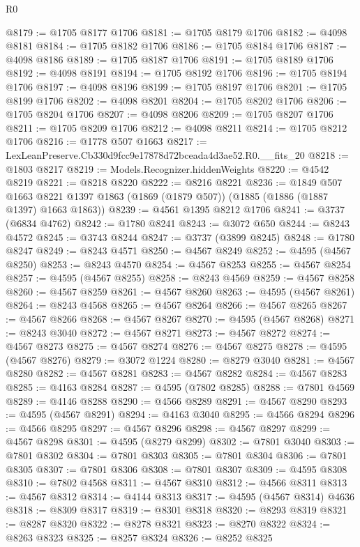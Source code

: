 \begin{lexlean}{R0}
\begin{coremodule}
@8179 := @1705 @8177 @1706
@8181 := @1705 @8179 @1706
@8182 := @4098 @8181
@8184 := @1705 @8182 @1706
@8186 := @1705 @8184 @1706
@8187 := @4098 @8186
@8189 := @1705 @8187 @1706
@8191 := @1705 @8189 @1706
@8192 := @4098 @8191
@8194 := @1705 @8192 @1706
@8196 := @1705 @8194 @1706
@8197 := @4098 @8196
@8199 := @1705 @8197 @1706
@8201 := @1705 @8199 @1706
@8202 := @4098 @8201
@8204 := @1705 @8202 @1706
@8206 := @1705 @8204 @1706
@8207 := @4098 @8206
@8209 := @1705 @8207 @1706
@8211 := @1705 @8209 @1706
@8212 := @4098 @8211
@8214 := @1705 @8212 @1706
@8216 := @1778 @507 @1663
@8217 := LexLeanPreserve.Cb330d9fcc9e17878d72bceada4d3ae52.R0.__fits_20
@8218 := @1803 @8217
@8219 := Models.Recognizer.hiddenWeights
@8220 := @4542 @8219
@8221 := @8218 @8220
@8222 := @8216 @8221
@8236 := @1849
    @507
    @1663
    @8221
    @1397
    @1863
    (@1869 (@1879 @507))
    (@1885 (@1886 (@1887 @1397) @1663 @1863))
@8239 := @4561 @1395 @8212 @1706
@8241 := @3737 (@6834 @4762)
@8242 := @1780 @8241
@8243 := @3072 @650
@8244 := @8243 @4572
@8245 := @3743 @8244
@8247 := @3737 (@3899 @8245)
@8248 := @1780 @8247
@8249 := @8243 @4571
@8250 := @4567 @8249
@8252 := @4595 (@4567 @8250)
@8253 := @8243 @4570
@8254 := @4567 @8253
@8255 := @4567 @8254
@8257 := @4595 (@4567 @8255)
@8258 := @8243 @4569
@8259 := @4567 @8258
@8260 := @4567 @8259
@8261 := @4567 @8260
@8263 := @4595 (@4567 @8261)
@8264 := @8243 @4568
@8265 := @4567 @8264
@8266 := @4567 @8265
@8267 := @4567 @8266
@8268 := @4567 @8267
@8270 := @4595 (@4567 @8268)
@8271 := @8243 @3040
@8272 := @4567 @8271
@8273 := @4567 @8272
@8274 := @4567 @8273
@8275 := @4567 @8274
@8276 := @4567 @8275
@8278 := @4595 (@4567 @8276)
@8279 := @3072 @1224
@8280 := @8279 @3040
@8281 := @4567 @8280
@8282 := @4567 @8281
@8283 := @4567 @8282
@8284 := @4567 @8283
@8285 := @4163 @8284
@8287 := @4595 (@7802 @8285)
@8288 := @7801 @4569
@8289 := @4146 @8288
@8290 := @4566 @8289
@8291 := @4567 @8290
@8293 := @4595 (@4567 @8291)
@8294 := @4163 @3040
@8295 := @4566 @8294
@8296 := @4566 @8295
@8297 := @4567 @8296
@8298 := @4567 @8297
@8299 := @4567 @8298
@8301 := @4595 (@8279 @8299)
@8302 := @7801 @3040
@8303 := @7801 @8302
@8304 := @7801 @8303
@8305 := @7801 @8304
@8306 := @7801 @8305
@8307 := @7801 @8306
@8308 := @7801 @8307
@8309 := @4595 @8308
@8310 := @7802 @4568
@8311 := @4567 @8310
@8312 := @4566 @8311
@8313 := @4567 @8312
@8314 := @4144 @8313
@8317 := @4595 (@4567 @8314) @4636
@8318 := @8309 @8317
@8319 := @8301 @8318
@8320 := @8293 @8319
@8321 := @8287 @8320
@8322 := @8278 @8321
@8323 := @8270 @8322
@8324 := @8263 @8323
@8325 := @8257 @8324
@8326 := @8252 @8325

\end{coremodule}
\end{lexlean}
